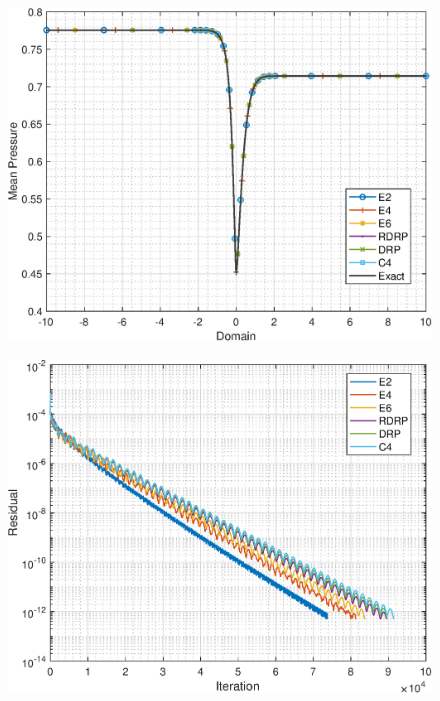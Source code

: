 \documentclass[conf]{new-aiaa}
\begin{document}
\begin{figure}
\centering
\begin{minipage}{.5\textwidth}
  \centering
  \includegraphics[width=0.95\linewidth]{Figures/C1P1_SteadyState}
  \label{fig:C1P1_SteadyState}
\end{minipage}%
\begin{minipage}{.5\textwidth}
  \centering
  \includegraphics[width=0.95\linewidth]{Figures/C1P1_TriDi_Scaling_ROC}
  \label{fig:C1P1_ROC}
\end{minipage}
\end{figure}
\end{document}
